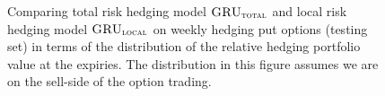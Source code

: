 \documentclass[letterpaper,12pt,titlepage,oneside,final]{book}
\numberwithin{equation}{section}
\theoremstyle{definition}
\newcommand{\modelT}{\textsc{GRU}_{\textsc{total}}}
\newcommand{\modelL}{\textsc{GRU}_{\textsc{local}}}
\begin{document}
\begin{figure}[htp!]
	\centering
	
	\caption{Comparing total risk hedging model $\modelT$ and local risk hedging model $\modelL$ on weekly hedging put options (testing set) in terms of the distribution of the  relative hedging portfolio value at the expiries. The distribution in this figure assumes we are on the sell-side of the option trading.} \label{fig:putTotalW1}
	\centering

\end{figure}
\end{document}
